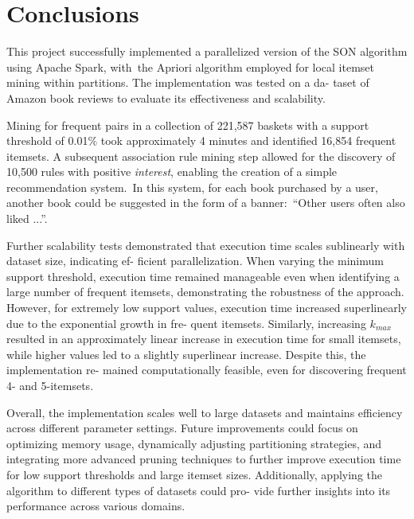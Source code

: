 \documentclass{Class/julia}
\begin{document}
\section{Conclusions}\label{sec:5}

This project successfully implemented a parallelized version of the SON algorithm using Apache Spark, with~the Apriori algorithm employed for local itemset mining within partitions. The implementation was tested on a da- taset of Amazon book reviews to evaluate its effectiveness and scalability.

Mining for frequent pairs in a collection of 221,587 baskets with a support threshold of 0.01\% took approximately 4 minutes and identified 16,854 frequent itemsets. A subsequent association rule mining step allowed for the discovery of 10,500 rules with positive \textit{interest}, enabling the creation of a simple recommendation system.~In this system, for each book purchased by a user, another book could be suggested in the form of a banner:\ ``Other users often also liked ...''.

Further scalability tests demonstrated that execution time scales sublinearly with dataset size, indicating ef- ficient parallelization. When varying the minimum support threshold, execution time remained manageable even when identifying a large number of frequent itemsets, demonstrating the robustness of the approach. However, for extremely low support values, execution time increased superlinearly due to the exponential growth in fre- quent itemsets. Similarly, increasing \( k_{max} \) resulted in an approximately linear increase in execution time for small itemsets, while higher values led to a slightly superlinear increase. Despite this, the implementation re- mained computationally feasible, even for discovering frequent 4- and 5-itemsets.

Overall, the implementation scales well to large datasets and maintains efficiency across different parameter settings. Future improvements could focus on optimizing memory usage, dynamically adjusting partitioning strategies, and integrating more advanced pruning techniques to further improve execution time for low support thresholds and large itemset sizes. Additionally, applying the algorithm to different types of datasets could pro- vide further insights into its performance across various domains.

\end{document}
